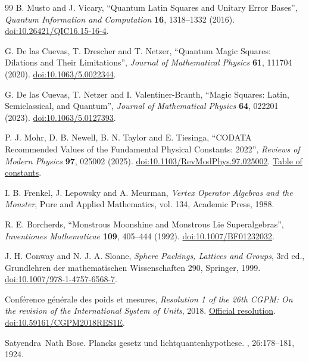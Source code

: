 \begin{thebibliography}{99}
 B. Musto and J. Vicary, ``Quantum Latin Squares and Unitary Error Bases'', \emph{Quantum Information and Computation} \textbf{16}, 1318--1332 (2016). \href{https://doi.org/10.26421/QIC16.15-16-4}{doi:10.26421/QIC16.15-16-4}.

 G. De las Cuevas, T. Drescher and T. Netzer, ``Quantum Magic Squares: Dilations and Their Limitations'', \emph{Journal of Mathematical Physics} \textbf{61}, 111704 (2020). \href{https://doi.org/10.1063/5.0022344}{doi:10.1063/5.0022344}.

 G. De las Cuevas, T. Netzer and I. Valentiner-Branth, ``Magic Squares: Latin, Semiclassical, and Quantum'', \emph{Journal of Mathematical Physics} \textbf{64}, 022201 (2023). \href{https://doi.org/10.1063/5.0127393}{doi:10.1063/5.0127393}.

 P. J. Mohr, D. B. Newell, B. N. Taylor and E. Tiesinga, ``CODATA Recommended Values of the Fundamental Physical Constants: 2022'', \emph{Reviews of Modern Physics} \textbf{97}, 025002 (2025). \href{https://doi.org/10.1103/RevModPhys.97.025002}{doi:10.1103/RevModPhys.97.025002}. \href{https://physics.nist.gov/cuu/Constants/Table/allascii.txt}{Table of constants}.

 I. B. Frenkel, J. Lepowsky and A. Meurman, \emph{Vertex Operator Algebras and the Monster}, Pure and Applied Mathematics, vol. 134, Academic Press, 1988.

 R. E. Borcherds, ``Monstrous Moonshine and Monstrous Lie Superalgebras'', \emph{Inventiones Mathematicae} \textbf{109}, 405--444 (1992). \href{https://doi.org/10.1007/BF01232032}{doi:10.1007/BF01232032}.

 J. H. Conway and N. J. A. Sloane, \emph{Sphere Packings, Lattices and Groups}, 3rd ed., Grundlehren der mathematischen Wissenschaften 290, Springer, 1999. \href{https://doi.org/10.1007/978-1-4757-6568-7}{doi:10.1007/978-1-4757-6568-7}.

 Conférence générale des poids et mesures, \emph{Resolution 1 of the 26th CGPM: On the revision of the International System of Units}, 2018. \href{https://www.bipm.org/en/committees/cg/cgpm/26-2018/resolution-1}{Official resolution}. \href{https://doi.org/10.59161/CGPM2018RES1E}{doi:10.59161/CGPM2018RES1E}.

 Satyendra~Nath Bose.
\newblock Plancks gesetz und lichtquantenhypothese.
, 26:178--181, 1924.


\end{thebibliography}
